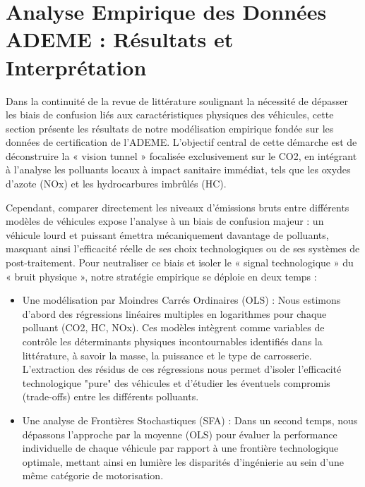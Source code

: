 \section{Analyse Empirique des Données ADEME : Résultats et Interprétation}

Dans la continuité de la revue de littérature soulignant la nécessité de dépasser les biais de confusion liés aux caractéristiques physiques des véhicules, cette section présente les résultats de notre modélisation empirique fondée sur les données de certification de l'ADEME. L'objectif central de cette démarche est de déconstruire la « vision tunnel » focalisée exclusivement sur le CO2, en intégrant à l'analyse les polluants locaux à impact sanitaire immédiat, tels que les oxydes d'azote (NOx) et les hydrocarbures imbrûlés (HC).

Cependant, comparer directement les niveaux d'émissions bruts entre différents modèles de véhicules expose l'analyse à un biais de confusion majeur : un véhicule lourd et puissant émettra mécaniquement davantage de polluants, masquant ainsi l'efficacité réelle de ses choix technologiques ou de ses systèmes de post-traitement. Pour neutraliser ce biais et isoler le « signal technologique » du « bruit physique », notre stratégie empirique se déploie en deux temps :

\par\vspace{0.9em}

\begin{itemize}
    \item[-] Une modélisation par Moindres Carrés Ordinaires (OLS) : Nous estimons d'abord des régressions linéaires multiples en logarithmes pour chaque polluant (CO2, HC, NOx). Ces modèles intègrent comme variables de contrôle les déterminants physiques incontournables identifiés dans la littérature, à savoir la masse, la puissance et le type de carrosserie. L'extraction des résidus de ces régressions nous permet d'isoler l'efficacité technologique "pure" des véhicules et d'étudier les éventuels compromis (trade-offs) entre les différents polluants.

    \vspace{0.5em}

    \item[-] Une analyse de Frontières Stochastiques (SFA) : Dans un second temps, nous dépassons l'approche par la moyenne (OLS) pour évaluer la performance individuelle de chaque véhicule par rapport à une frontière technologique optimale, mettant ainsi en lumière les disparités d'ingénierie au sein d'une même catégorie de motorisation.
\end{itemize}

